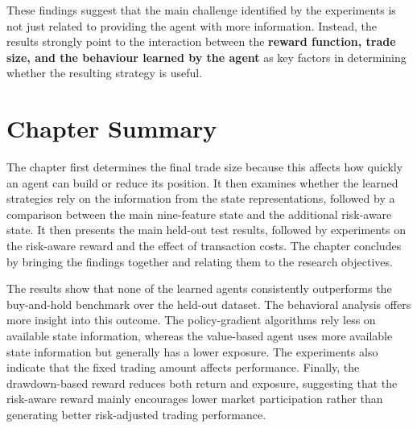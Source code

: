 These findings suggest that the main challenge identified by the
experiments is not just related to providing the agent with more
information. Instead, the results strongly point to the interaction
between the \textbf{reward function, trade size, and the behaviour
learned by the agent} as key factors in determining whether the
resulting strategy is useful.

\section{Chapter Summary}

The chapter first determines the final trade size because this affects
how quickly an agent can build or reduce its position. It then examines
whether the learned strategies rely on the information from the state
representations, followed by a comparison between the main nine-feature
state and the additional risk-aware state. It then presents the main
held-out test results, followed by experiments on the risk-aware reward
and the effect of transaction costs. The chapter concludes by bringing
the findings together and relating them to the research objectives.

The results show that none of the learned agents consistently
outperforms the buy-and-hold benchmark over the held-out dataset. The
behavioral analysis offers more insight into this outcome. The
policy-gradient algorithms rely less on available state information,
whereas the value-based agent uses more available state information but
generally has a lower exposure. The experiments also indicate that the
fixed trading amount affects performance. Finally, the drawdown-based
reward reduces both return and exposure, suggesting that the risk-aware
reward mainly encourages lower market participation rather than
generating better risk-adjusted trading performance.
